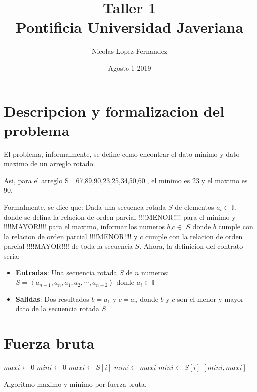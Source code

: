 \documentclass[12pt]{report}
\title {
    {Taller 1}  \\
    {\large Pontificia Universidad Javeriana}\\
}
\author{Nicolas Lopez Fernandez }
\date{Agosto 1 2019}
\begin{document}
\maketitle

\section{Descripcion y formalizacion del problema}
El problema, informalmente, se define como encontrar el dato minimo y dato maximo de un arreglo rotado.

Asi, para el arreglo S=[67,89,90,23,25,34,50,60], el minimo es 23 y el maximo es 90.

Formalmente, se dice que: Dada una secuenca rotada $S$ de elementos $a_{i} \in \mathbb{T}$, donde se defina la relacion de orden parcial !!!!MENOR!!!! para el minimo y !!!!MAYOR!!!! para el maximo, informar los numeros $b$,$c \in$ $S$ donde $b$ cumple con la relacion de orden parcial !!!!MENOR!!!! y $c$ cumple con la relacion de orden parcial !!!!MAYOR!!!! de toda la secuencia $S$. Ahora, la definicion del contrato seria:
\begin{itemize}

\item \textbf{Entradas}: Una secuencia rotada $S$ de $n$
    numeros: $S=\left<a_{n-1},a_{n},a_{1},a_{2},\cdots,a_{n-2}\right>$ donde
    $a_{i}\in \mathbb{T}$
\item \textbf{Salidas}: Dos resultados $b=a_{1}$ y $c=a_{n}$ donde $b$ y $c$ son el menor y       mayor dato de la secuencia rotada $S$

\end{itemize}

\section{Fuerza bruta}
\begin{algorithm}[H]
  \begin{algorithmic}[1]
      \State$maxi \leftarrow 0$
      \State$mini \leftarrow 0$
            \State$maxi \leftarrow S[i]$
        \EndIf
      \EndFor
      \State$mini \leftarrow maxi$
            \State$mini \leftarrow S[i]$
        \EndIf
      \EndFor
      \State\Return $[mini, maxi]$
    \EndProcedure
  \end{algorithmic}
  \caption{Algoritmo maximo y minimo por fuerza bruta.}
\end{algorithm}
\end{document}
